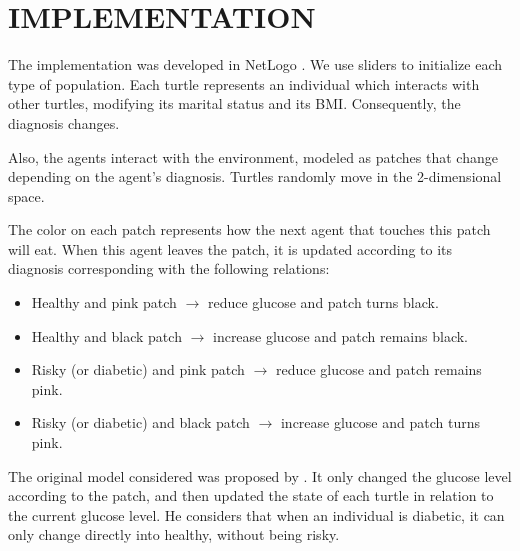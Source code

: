 \section{IMPLEMENTATION}
The implementation was developed in NetLogo \cite{}. We use sliders to initialize each type of population. Each turtle represents an individual which interacts with other turtles, modifying its marital status and its BMI. Consequently, the diagnosis changes. 

Also, the agents interact with the environment, modeled as patches that change depending on the agent's diagnosis. Turtles randomly move in the 2-dimensional space.

The color on each patch represents how the next agent that touches this patch will eat. When this agent leaves the patch, it is updated according to its diagnosis corresponding with the following relations:
\begin{itemize}
\item Healthy and pink patch $\rightarrow$ reduce glucose and patch turns black.
\item Healthy and black patch $\rightarrow$ increase glucose and patch remains black.
\item Risky (or diabetic) and pink patch $\rightarrow$ reduce glucose and patch remains pink.
\item Risky (or diabetic) and black patch $\rightarrow$ increase glucose and patch turns pink.
\end{itemize}

The original model considered was proposed by \cite{netlogomodel}. It only changed the glucose level according to the patch, and then updated the state of each turtle in relation to the current glucose level. He considers that when an individual is diabetic, it can only change directly into healthy, without being risky.

